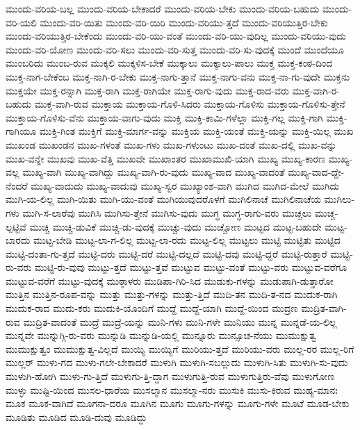 {ಮುಂದು-ವರಿಯ-ಬಲ್ಲ
ಮುಂದು-ವರಿಯ-ಬೇಕಾದರೆ
ಮುಂದು-ವರಿಯ-ಬೇಕು
ಮುಂದು-ವರಿಯ-ಬಹುದು
ಮುಂದು-ವರಿ-ಯಲಿ
ಮುಂದು-ವರಿ-ಯಿತು
ಮುಂದು-ವರಿ-ಯಿರಿ
ಮುಂದು-ವರಿಯು-ತ್ತದೆ
ಮುಂದು-ವರಿಯುತ್ತಿರ-ಬೇಕು
ಮುಂದು-ವರಿಯುತ್ತಿರ-ಬೇಕೆಂದು
ಮುಂದು-ವರಿ-ಯು-ವಂತೆ
ಮುಂದು-ವರಿ-ಯು-ವುದಿಲ್ಲ
ಮುಂದು-ವರಿಯು-ವುದು
ಮುಂದು-ವರಿ-ಯೋಣ
ಮುಂದು-ವರಿ-ಸಲು
ಮುಂದು-ವರಿ-ಸುತ್ತ
ಮುಂದು-ವರಿ-ಸು-ವುದಕ್ಕೆ
ಮುಂದೆ
ಮುಂದೆಯೂ
ಮುಂಬರಿದು
ಮುಂಬ-ರುವ
ಮುಕ್ಕಲಿ
ಮುಕ್ಕಳಿಸ-ಬೇಕೆ
ಮುಕ್ಕಾಲು
ಮುಕ್ಕಾಲು-ಪಾಲು
ಮುಕ್ತ
ಮುಕ್ತ-ಕಂಠ-ದಿಂದ
ಮುಕ್ತ-ನಾಗ-ಬೇಕೆಂಬ
ಮುಕ್ತ-ನಾಗಿ-ರ-ಬೇಕು
ಮುಕ್ತ-ನಾಗು-ತ್ತಾನೆ
ಮುಕ್ತ-ನಾಗು-ವನು
ಮುಕ್ತ-ನಾ-ಗು-ವುದೇ
ಮುಕ್ತನು
ಮುಕ್ತಯೇ
ಮುಕ್ತ-ರನ್ನಾಗಿ
ಮುಕ್ತ-ರಾಗಿ
ಮುಕ್ತ-ರಾಗಿಯೇ
ಮುಕ್ತ-ರಾಗು-ವುದು
ಮುಕ್ತ-ರಾದ-ವರು
ಮುಕ್ತ-ವಾಗಿ-ರ-ಬಹುದು
ಮುಕ್ತ-ವಾಗಿ-ರುವ
ಮುಕ್ತಾಯ
ಮುಕ್ತಾಯ-ಗೊಳಿ-ಸಿದರು
ಮುಕ್ತಾಯ-ಗೊಳಿಸು
ಮುಕ್ತಾಯ-ಗೊಳಿಸು-ತ್ತೇನೆ
ಮುಕ್ತಾಯ-ಗೊಳಿಸು-ವೆನು
ಮುಕ್ತಾಯ-ವಾಗು-ವುದು
ಮುಕ್ತಿ
ಮುಕ್ತಿ-ಕಾಮಿ-ಗಳೆಲ್ಲಾ
ಮುಕ್ತಿ-ಗಲ್ಲ
ಮುಕ್ತಿ-ಗಾಗಿ
ಮುಕ್ತಿ-ಗಾಗಿಯೂ
ಮುಕ್ತಿ-ಗಿಂತ
ಮುಕ್ತಿಗೆ
ಮುಕ್ತಿ-ಮಾರ್ಗ-ವನ್ನು
ಮುಕ್ತಿಯ
ಮುಕ್ತಿ-ಯಂತೆ
ಮುಕ್ತಿ-ಯನ್ನು
ಮುಕ್ತಿ-ಯಿಲ್ಲ
ಮುಖ
ಮುಖಂಡ
ಮುಖಂಡನ
ಮುಖ-ಗಳಂತೆ
ಮುಖ-ಗಳು
ಮುಖ-ಗಳುಂಟು
ಮುಖ-ದಂತೆ
ಮುಖ-ದಲ್ಲಿ
ಮುಖ-ವನ್ನು
ಮುಖ-ವನ್ನೇ
ಮುಖವು
ಮುಖ-ವೆತ್ತಿ
ಮುಖವೇ
ಮುಖಾಂತರ
ಮುಖಾಮುಖಿ-ಯಾಗಿ
ಮುಖ್ಯ
ಮುಖ್ಯ-ಕಾರಣ
ಮುಖ್ಯ-ವಲ್ಲ
ಮುಖ್ಯ-ವಾಗಿ
ಮುಖ್ಯ-ವಾಗಿದ್ದು
ಮುಖ್ಯ-ವಾಗಿ-ರು-ವುದು
ಮುಖ್ಯ-ವಾದ
ಮುಖ್ಯ-ವಾದಂತೆ
ಮುಖ್ಯ-ವಾದ-ದ್ದೇ-ನೆಂದರೆ
ಮುಖ್ಯ-ವಾದುದು
ಮುಖ್ಯ-ವಾದುವು
ಮುಖ್ಯ-ಸ್ವರ
ಮುಖ್ಯಾಂಶ-ವಾಗಿ
ಮುಗಿದ
ಮುಗಿದ-ಮೇಲೆ
ಮುಗಿದು
ಮುಗಿ-ಯ-ಲಿಲ್ಲ
ಮುಗಿ-ಯಿತು
ಮುಗಿ-ಯು-ವಂತೆ
ಮುಗಿಯುವುದರೊಳಗೆ
ಮುಗಿಲಿನಾಚೆ
ಮುಗಿಲಿನಾಚೆಯ
ಮುಗಿಲು-ಗಳು
ಮುಗಿ-ಸ-ಲಾರೆವು
ಮುಗಿಸಿ
ಮುಗಿಸು-ತ್ತೇನೆ
ಮುಗಿಸು-ವುದು
ಮುಗ್ಧ
ಮುಗ್ಧ-ರಾಗು-ವರು
ಮುಚ್ಚಲು
ಮುಚ್ಚ-ಲ್ಪಟ್ಟಿವೆ
ಮುಚ್ಚಿ
ಮುಚ್ಚಿ-ಡುವಿಕೆ
ಮುಚ್ಚಿ-ಡು-ವುದಕ್ಕೆ
ಮುಚ್ಚು-ವುದು
ಮುಚ್ಚೋಣ
ಮುಟ್ಟದ
ಮುಟ್ಟ-ಬಹುದೇ
ಮುಟ್ಟ-ಬಾರದು
ಮುಟ್ಟ-ಬೇಡಿ
ಮುಟ್ಟ-ಲಾ-ಗ-ಲಿಲ್ಲ
ಮುಟ್ಟ-ಲಾ-ರದು
ಮುಟ್ಟ-ಲಿಲ್ಲ
ಮುಟ್ಟಲು
ಮುಟ್ಟಿ
ಮುಟ್ಟಿತು
ಮುಟ್ಟಿದ
ಮುಟ್ಟಿ-ದಂತಾ-ಗು-ತ್ತದೆ
ಮುಟ್ಟಿ-ದರು
ಮುಟ್ಟಿ-ದರೆ
ಮುಟ್ಟಿ-ದಲ್ಲದೆ
ಮುಟ್ಟಿ-ದವು
ಮುಟ್ಟಿ-ದ್ದರೆ
ಮುಟ್ಟಿ-ರುತ್ತಾರೆ
ಮುಟ್ಟಿ-ರು-ವರು
ಮುಟ್ಟಿ-ರು-ವುವು
ಮುಟ್ಟು-ತ್ತದೆ
ಮುಟ್ಟು-ತ್ತವೆ
ಮುಟ್ಟುವ
ಮುಟ್ಟು-ವಂತೆ
ಮುಟ್ಟು-ವರು
ಮುಟ್ಟುವ-ವರೆಗೂ
ಮುಟ್ಟುವ-ವರೆಗೆ
ಮುಟ್ಟು-ವುದಕ್ಕೆ
ಮುಠ್ಠಾಳರು
ಮುಡಿಪಾ-ಗಿರಿ-ಸಿದ
ಮುಡುಕು-ಗಳನ್ನು
ಮುಡುಪಾಗಿ-ಡುತ್ತಾರೋ
ಮುತ್ತಿನ
ಮುತ್ತಿನ-ರೂಪ-ವನ್ನು
ಮುತ್ತು
ಮುತ್ತು-ಗಳನ್ನು
ಮುತ್ತು-ತ್ತಿದೆ
ಮುದಿ-ತನ
ಮುದಿ-ತ-ನದ
ಮುದುಕ-ರಾಗಿ
ಮುದುಕ-ರಾದ
ಮುದು-ಕರು
ಮುದುಕಿ-ಯೊಂದಿಗೆ
ಮುದ್ದೆ
ಮುದ್ದೆ-ಯಾಗಿ
ಮುದ್ದೆ-ಯಿಂದ
ಮುದ್ರಣ
ಮುದ್ರಿತ-ವಾಗಿ-ರುವ
ಮುದ್ರಿತ-ವಾದಂತೆ
ಮುದ್ರೆ
ಮುದ್ರೆ-ಯನ್ನು
ಮುನಿ-ಗಳು
ಮುನಿ-ಗಳೇ
ಮುನಿಯು
ಮುನ್ನ
ಮುನ್ನಡೆ-ಯ-ಲಿಲ್ಲ
ಮುನ್ನವೇ
ಮುನ್ನುಗ್ಗಿ-ರು-ವರು
ಮುನ್ನುಡಿ
ಮುನ್ನುಡಿ-ಯಲ್ಲಿ
ಮುನ್ನೂರು
ಮುನ್ಸೂಚ-ನೆಯು
ಮುಮುಕ್ಷುತ್ವ
ಮುಮುಕ್ಷುತ್ವಂ
ಮುಮುಕ್ಷುತ್ವ-ವಿಲ್ಲದೆ
ಮುಯ್ಯಿ
ಮುಯ್ಯಿಗೆ
ಮುರಿಯು-ತ್ತದೆ
ಮುರಿಯು-ವರು
ಮುಲ್ಲ-ರರ
ಮುಲ್ಲ-ರಿಗೆ
ಮುಲ್ಲರ್
ಮುಳು-ಗದ
ಮುಳು-ಗಲೇ-ಬೇಕಾದರೆ
ಮುಳುಗಿ
ಮುಳುಗಿ-ಸಬಲ್ಲುದು
ಮುಳುಗಿ-ಸಿತು
ಮುಳುಗಿ-ಸು-ವುದು
ಮುಳುಗಿ-ಹೋಗಿ
ಮುಳು-ಗು-ತ್ತಿದೆ
ಮುಳುಗು-ತ್ತಿ-ದ್ದಾಗ
ಮುಳುಗುತ್ತಿ-ರುವ
ಮುಳುಗುತ್ತಿರು-ವೆವು
ಮುಳುಗೋಣ
ಮುಳ್ಳು
ಮುಷ್ಟಿ-ಯಿಂದ
ಮುಸಲ-ಧಾರೆಯ
ಮುಸಲ್ಮಾನ
ಮುಸಲ್ಮಾ-ನರು
ಮುಸುಕಿ
ಮುಸು-ಕಿರುವ
ಮುಹ್ಯ-ಮಾನಃ
ಮೂಕ
ಮೂಕ-ವಾಗಿದೆ
ಮೂಗನಾ-ದರೂ
ಮೂಗಿನ
ಮೂಗು
ಮೂಗು-ಗಳನ್ನು
ಮೂಗು-ಗಳೇ
ಮೂಟೆ
ಮೂಡ-ಬೇಕು
ಮೂಡಿತು
ಮೂಡಿದ
ಮೂಡಿ-ದುವು
ಮೂಡಿದ್ದು
}
